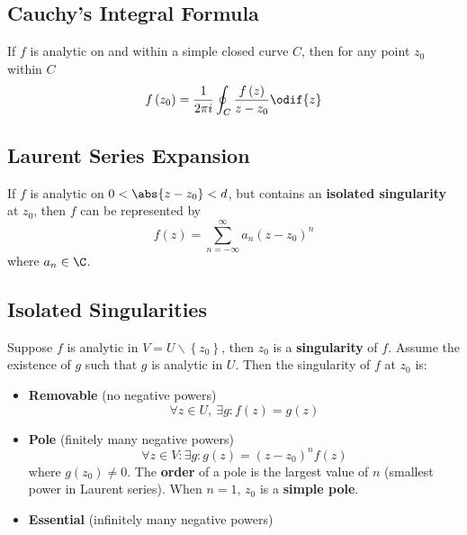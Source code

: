 \documentclass{article}
\begin{document}
\begin{multicols*}{3}
    \subsection{Cauchy's Integral Formula}
    If \(f\) is analytic on and within a simple closed curve \(C\),
    then for any point \(z_0\) within \(C\)
    \begin{equation*}
        f\left( z_0 \right) = \frac{1}{2 \pi i} \oint_C \frac{f\left( z \right)}{z - z_0} \odif{z}
    \end{equation*}
    \subsection{Laurent Series Expansion}
    If \(f\) is analytic on \(0 < \abs{z - z_0} < d\), but contains
    an \textbf{isolated singularity} at \(z_0\), then \(f\) can be
    represented by
    \begin{equation*}
        f\left( z \right) = \sum_{n = -\infty}^\infty a_n \left( z - z_0 \right)^n
    \end{equation*}
    where \(a_n \in \C\).
    \subsection{Isolated Singularities}
    Suppose \(f\) is analytic in \(V = U\backslash\left\{ z_0 \right\}\), then \(z_0\) is a \textbf{singularity} of \(f\).
    Assume the existence of \(g\) such that \(g\) is analytic in \(U\). Then the singularity of \(f\) at \(z_0\) is:
    \begin{itemize}
        \item \textbf{Removable} (no negative powers)
              \begin{equation*}
                  \forall z \in U,\: \exists g : f\left( z \right) = g\left( z \right)
              \end{equation*}
        \item \textbf{Pole} (finitely many negative powers)
              \begin{equation*}
                  \forall z \in V : \exists g : g\left( z \right) = \left( z - z_0 \right)^n f\left( z \right)
              \end{equation*}
              where \(g\left( z_0 \right) \neq 0\).
              The \textbf{order} of a pole is the largest value of \(n\)
              (smallest power in Laurent series). When \(n = 1\), \(z_0\) is a \textbf{simple pole}.
        \item \textbf{Essential} (infinitely many negative powers)
    \end{itemize}

\end{multicols*}
\end{document}
